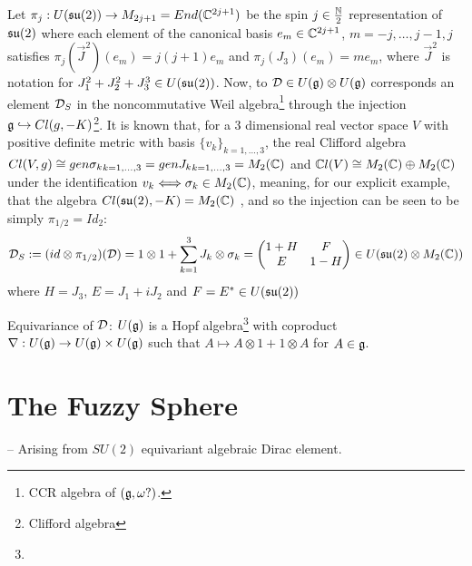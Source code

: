 Let $\pi_j: U(\mathfrak{su}(2)) \to M_{2j+1} = End(\mathbb{C}^{2j+1})$ be the spin $j \in \frac{\mathbb{N}}{2}$ representation of $\mathfrak{su}(2)$ where each element of the canonical basis $e_m \in \mathbb{C}^{2j+1}$, $m = -j, \dots, j-1, j$ satisfies $\pi_j(\vec J^2)(e_m) = j(j+1) e_m$ and $\pi_j(J_3)(e_m) = m e_m$, where $\vec J^2$ is notation for $J_1^2 + J_2^2 + J_3^3 \in U(\mathfrak{su}(2))$.
Now, to $\mathcal D \in U(\mathfrak{g}) \otimes U(\mathfrak{g})$ corresponds an element $\mathcal D_S$ in the noncommutative Weil algebra\footnote{CCR algebra of $(\mathfrak{g}, \omega?)$. } through the injection $\mathfrak{g} \hookrightarrow Cl(g, -K)$\footnote{Clifford algebra}. It is known that, for a $3$ dimensional real vector space $V$ with positive definite metric with basis $\{v_k\}_{k = 1, \dots, 3}$, the real Clifford algebra $Cl(V, g) \cong gen{\sigma_k}_{k = 1, \dots, 3} = gen{J_k}_{k = 1, \dots, 3} = M_2(\mathbb{C})$ and $\mathbb{C} l(V) \cong M_2(\mathbb{C}) \oplus M_2(\mathbb{C})$ under the identification $v_k \Longleftrightarrow \sigma_k \in M_2(\mathbb{C})$, meaning, for our explicit example, that the algebra $Cl(\mathfrak{su}(2), -K) = M_2(\mathbb{C})$ 
, and so the injection can be seen to be simply $\pi_{1/2} = Id_2$:
\begin{equation}
    \mathcal D_S := (id \otimes \pi_{1/2})(\mathcal D) = 1 \otimes 1 + \sum_{k = 1}^3 J_k \otimes \sigma_k = \begin{pmatrix} 1 + H & F \\ E & 1 - H \end{pmatrix} \in U(\mathfrak{su}(2)\otimes M_2(\mathbb{C}))
\end{equation}
where $H = J_3$, $E = J_1 + iJ_2$ and $F = E^* \in U(\mathfrak{su}(2))$


Equivariance of $\mathcal D$: $U(\mathfrak{g})$ is a Hopf algebra\footnote{} with coproduct $\nabla: U(\mathfrak{g}) \to U(\mathfrak{g}) \times U(\mathfrak{g})$ such that $A \mapsto A \otimes 1 + 1 \otimes A$ for $A \in \mathfrak{g}$.

\section{The Fuzzy Sphere}

-- Arising from $SU(2)$ equivariant algebraic Dirac element.

